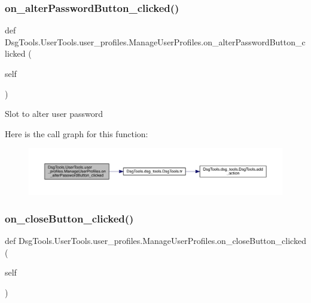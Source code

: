 \subsubsection{\texorpdfstring{on\+\_\+alter\+Password\+Button\+\_\+clicked()}{on\_alterPasswordButton\_clicked()}}
{\footnotesize\ttfamily def Dsg\+Tools.\+User\+Tools.\+user\+\_\+profiles.\+Manage\+User\+Profiles.\+on\+\_\+alter\+Password\+Button\+\_\+clicked (\begin{DoxyParamCaption}\item[{}]{self }\end{DoxyParamCaption})}

\begin{DoxyVerb}Slot to alter user password
\end{DoxyVerb}
 Here is the call graph for this function\+:
\nopagebreak
\begin{figure}[H]
\begin{center}
\leavevmode
\includegraphics[width=350pt]{class_dsg_tools_1_1_user_tools_1_1user__profiles_1_1_manage_user_profiles_a7e0fe95a8a424f02874a61d98ae5ea56_cgraph}
\end{center}
\end{figure}
\mbox{\label{class_dsg_tools_1_1_user_tools_1_1user__profiles_1_1_manage_user_profiles_a5098b2c130ed7bbc719c80ecf6f8e633}} 
\subsubsection{\texorpdfstring{on\+\_\+close\+Button\+\_\+clicked()}{on\_closeButton\_clicked()}}
{\footnotesize\ttfamily def Dsg\+Tools.\+User\+Tools.\+user\+\_\+profiles.\+Manage\+User\+Profiles.\+on\+\_\+close\+Button\+\_\+clicked (\begin{DoxyParamCaption}\item[{}]{self }\end{DoxyParamCaption})}

